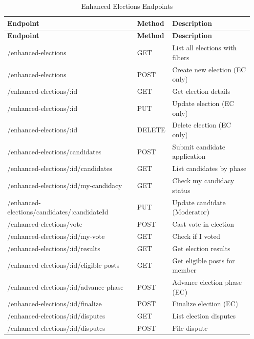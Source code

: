 \documentclass[12pt,a4paper]{article}
\begin{document}
\begin{longtable}{>{\small\ttfamily}p{8.5cm}%
                  >{\small\centering\arraybackslash}p{1.3cm}%
                  >{\small}p{6.7cm}}
\caption{Enhanced Elections Endpoints} \\

\rowcolor{Teal}
\color{white}\normalfont\bfseries Endpoint & \color{white}\bfseries Method & \color{white}\bfseries Description \\
\endfirsthead
\rowcolor{Teal}
\color{white}\normalfont\bfseries Endpoint & \color{white}\bfseries Method & \color{white}\bfseries Description \\
\endhead

\midrule
\rowcolor{LightTeal}/enhanced-elections & GET & List all elections with filters \\
/enhanced-elections & POST & Create new election (EC only) \\
\rowcolor{LightTeal}/enhanced-elections/:id & GET & Get election details \\
/enhanced-elections/:id & PUT & Update election (EC only) \\
\rowcolor{LightTeal}/enhanced-elections/:id & DELETE & Delete election (EC only) \\
/enhanced-elections/candidates & POST & Submit candidate application \\
\rowcolor{LightTeal}/enhanced-elections/:id/candidates & GET & List candidates by phase \\
/enhanced-elections/:id/my-candidacy & GET & Check my candidacy status \\
\rowcolor{LightTeal}/enhanced-elections/candidates/:candidateId & PUT & Update candidate (Moderator) \\
/enhanced-elections/vote & POST & Cast vote in election \\
\rowcolor{LightTeal}/enhanced-elections/:id/my-vote & GET & Check if I voted \\
/enhanced-elections/:id/results & GET & Get election results \\
\rowcolor{LightTeal}/enhanced-elections/:id/eligible-posts & GET & Get eligible posts for member \\
/enhanced-elections/:id/advance-phase & POST & Advance election phase (EC) \\
\rowcolor{LightTeal}/enhanced-elections/:id/finalize & POST & Finalize election (EC) \\
/enhanced-elections/:id/disputes & GET & List election disputes \\
\rowcolor{LightTeal}/enhanced-elections/:id/disputes & POST & File dispute \\
\bottomrule
\end{longtable}
\end{document}
